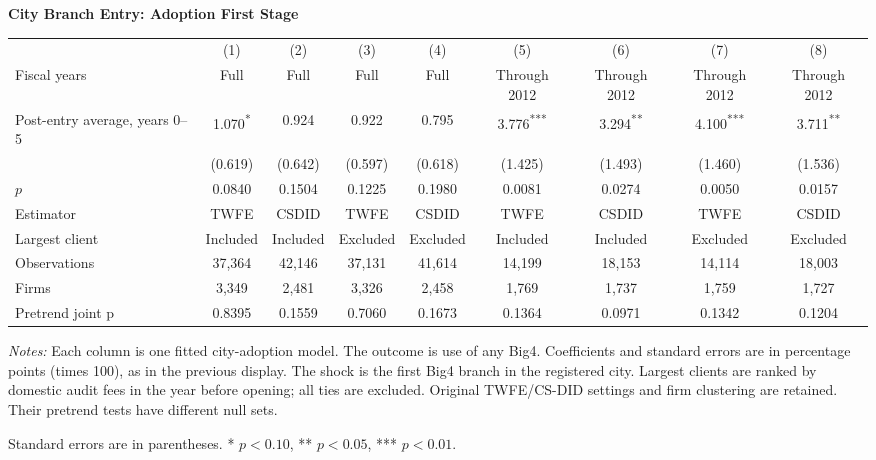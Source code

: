 \documentclass[10pt]{article}
\newcommand{\sym}[1]{\textsuperscript{#1}}
\begin{document}
\begin{minipage}{28.80cm}
\fontsize{10}{12}\selectfont
\setlength{\tabcolsep}{4pt}\renewcommand{\arraystretch}{1.08}
{\large\bfseries City Branch Entry: Adoption First Stage}\par\medskip
\begin{tabular*}{\linewidth}{@{\extracolsep{\fill}}lcccccccc@{}}
\toprule
 & (1) & (2) & (3) & (4) & (5) & (6) & (7) & (8) \\
Fiscal years & Full & Full & Full & Full & Through 2012 & Through 2012 & Through 2012 & Through 2012 \\
\midrule
Post-entry average, years 0--5 & 1.070\sym{*} & 0.924 & 0.922 & 0.795 & 3.776\sym{***} & 3.294\sym{**} & 4.100\sym{***} & 3.711\sym{**} \\
 & (0.619) & (0.642) & (0.597) & (0.618) & (1.425) & (1.493) & (1.460) & (1.536) \\
$p$ & 0.0840 & 0.1504 & 0.1225 & 0.1980 & 0.0081 & 0.0274 & 0.0050 & 0.0157 \\
\midrule
Estimator & TWFE & CSDID & TWFE & CSDID & TWFE & CSDID & TWFE & CSDID \\
Largest client & Included & Included & Excluded & Excluded & Included & Included & Excluded & Excluded \\
Observations & 37,364 & 42,146 & 37,131 & 41,614 & 14,199 & 18,153 & 14,114 & 18,003 \\
Firms & 3,349 & 2,481 & 3,326 & 2,458 & 1,769 & 1,737 & 1,759 & 1,727 \\
Pretrend joint p & 0.8395 & 0.1559 & 0.7060 & 0.1673 & 0.1364 & 0.0971 & 0.1342 & 0.1204 \\
\bottomrule\end{tabular*}\par\medskip
\fontsize{9}{11}\selectfont\textit{Notes:} Each column is one fitted city-adoption model. The outcome is use of any Big4. Coefficients and standard errors are in percentage points (times 100), as in the previous display. The shock is the first Big4 branch in the registered city. Largest clients are ranked by domestic audit fees in the year before opening; all ties are excluded. Original TWFE/CS-DID settings and firm clustering are retained. Their pretrend tests have different null sets.
\par Standard errors are in parentheses. * $p<0.10$, ** $p<0.05$, *** $p<0.01$.
\end{minipage}
\end{document}
